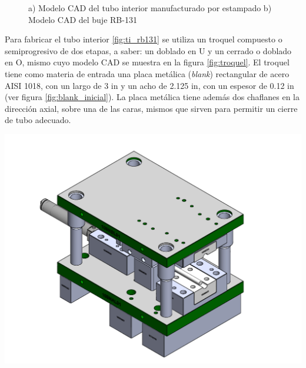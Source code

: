 \begin{figure}[H]
\begin{subfigure}[t]{0.35\textwidth}
\caption{}
\label{fig:buje_rb131}
\end{subfigure}
\caption{a) Modelo CAD del tubo interior manufacturado por estampado b) Modelo CAD del buje RB-131}
\end{figure}

Para fabricar el tubo interior \ref{fig:ti_rb131} se utiliza un troquel compuesto o semiprogresivo 
de dos etapas, a saber: un doblado en U y un cerrado o doblado en O, mismo cuyo modelo CAD se muestra 
en la figura \ref{fig:troquel}. El troquel tiene como materia de entrada una placa metálica 
(\textit{blank}) rectangular de acero AISI 1018, con un largo de 3 in y un acho de 2.125 in, 
con un espesor de 0.12 in (ver figura \ref{fig:blank_inicial}). La placa metálica tiene además 
dos chaflanes en la dirección axial, sobre una de las caras, mismos que sirven para permitir un 
cierre de tubo adecuado.



\begin{center}
\includegraphics[scale=0.4]{src/ch3/troquel.pdf}
\label{fig:troquel}
\end{center}

